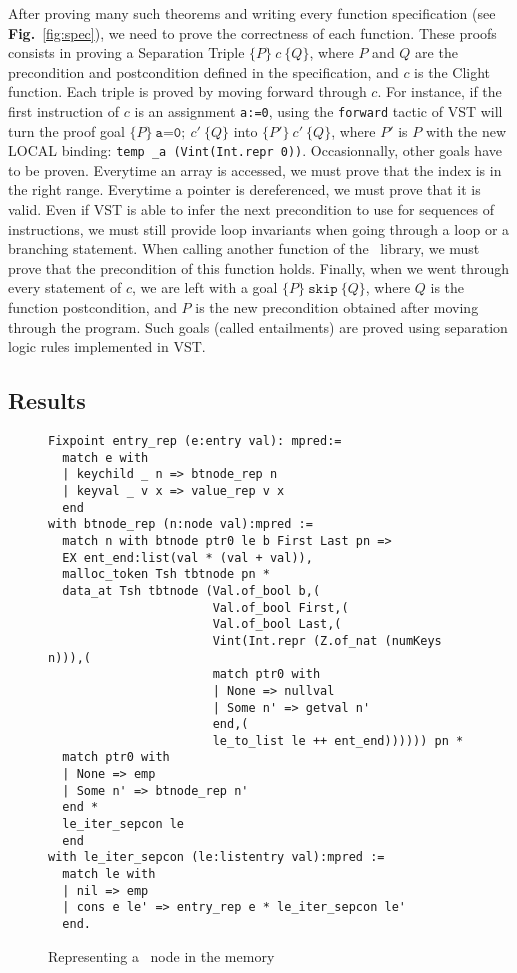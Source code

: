After proving many such theorems and writing every function specification (see \textbf{Fig.}~\ref{fig:spec}), we need to prove the correctness of each function.
These proofs consists in proving a Separation Triple $\{P\}~c~\{Q\}$, where $P$ and $Q$ are the precondition and postcondition defined in the specification, and $c$ is the Clight function.
Each triple is proved by moving forward through $c$.
For instance, if the first instruction of $c$ is an assignment \texttt{a:=0}, using the \texttt{forward} tactic of VST will turn the proof goal $\{P\}~\texttt{a=0};~c'~\{Q\}$ into $\{P'\}~c'~\{Q\}$,
where $P'$ is $P$ with the new LOCAL binding: \texttt{temp \_a (Vint(Int.repr 0))}.
Occasionnally, other goals have to be proven.
Everytime an array is accessed, we must prove that the index is in the right range.
Everytime a pointer is dereferenced, we must prove that it is valid.
Even if VST is able to infer the next precondition to use for sequences of instructions, we must still provide loop invariants when going through a loop or a branching statement.
When calling another function of the \btrees\ library, we must prove that the precondition of this function holds.
Finally, when we went through every statement of $c$, we are left with a goal $\{P\}~\texttt{skip}~\{Q\}$, where $Q$ is the function postcondition, and $P$ is the new precondition obtained after moving through the program.
Such goals (called entailments) are proved using separation logic rules implemented in VST.

\subsection{Results}



\begin{figure}
\begin{lstlisting}[language=Coq]
Fixpoint entry_rep (e:entry val): mpred:=
  match e with
  | keychild _ n => btnode_rep n
  | keyval _ v x => value_rep v x
  end
with btnode_rep (n:node val):mpred :=
  match n with btnode ptr0 le b First Last pn =>
  EX ent_end:list(val * (val + val)),
  malloc_token Tsh tbtnode pn *
  data_at Tsh tbtnode (Val.of_bool b,(
                       Val.of_bool First,(
                       Val.of_bool Last,(
                       Vint(Int.repr (Z.of_nat (numKeys n))),(
                       match ptr0 with
                       | None => nullval
                       | Some n' => getval n'
                       end,(
                       le_to_list le ++ ent_end)))))) pn *
  match ptr0 with
  | None => emp
  | Some n' => btnode_rep n'
  end *
  le_iter_sepcon le
  end
with le_iter_sepcon (le:listentry val):mpred :=
  match le with
  | nil => emp
  | cons e le' => entry_rep e * le_iter_sepcon le'
  end.
\end{lstlisting}
\label{fig:btnoderep}
\caption{Representing a \btree\ node in the memory}
\end{figure}


